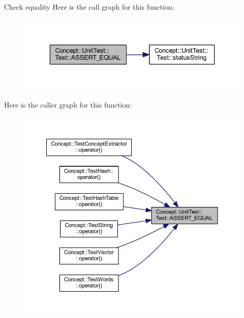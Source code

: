 Check equality Here is the call graph for this function\+:\nopagebreak
\begin{figure}[H]
\begin{center}
\leavevmode
\includegraphics[width=336pt]{class_concept_1_1_unit_test_1_1_test_ab12b779095f2e0a9322c8bffa2c8941b_cgraph}
\end{center}
\end{figure}
Here is the caller graph for this function\+:\nopagebreak
\begin{figure}[H]
\begin{center}
\leavevmode
\includegraphics[width=350pt]{class_concept_1_1_unit_test_1_1_test_ab12b779095f2e0a9322c8bffa2c8941b_icgraph}
\end{center}
\end{figure}
\mbox{\label{class_concept_1_1_unit_test_1_1_test_ad4d91c6b7d271d55fd037c2009b1927e}} 
